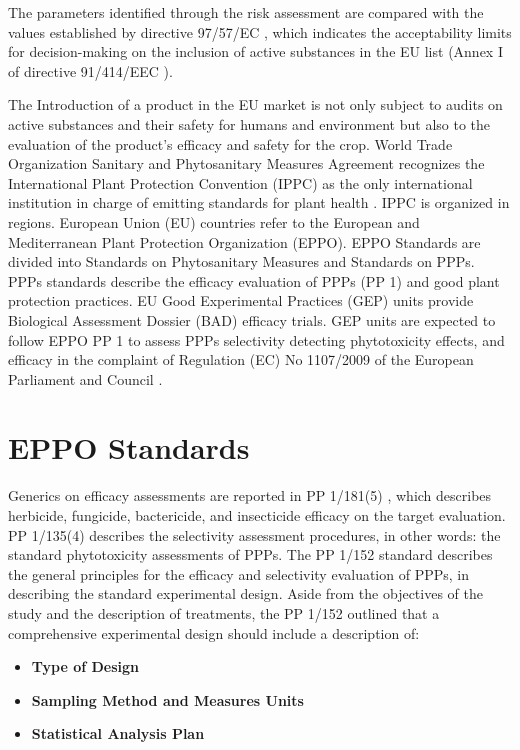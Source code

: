\documentclass[12pt,a4paper,oneside]{report}
\begin{document}
The parameters identified through the risk assessment are compared with the values 
established by directive 97/57/EC \cite{EURLex1997265}, which indicates the acceptability limits for 
decision-making on the inclusion of active substances in the EU list (Annex I of 
directive 91/414/EEC \cite{directive_91_414_EEC}).

The Introduction of a product in the EU market is not only subject to audits on
active substances and their safety for humans and environment but also to the evaluation 
of the product's efficacy and safety for the crop.
World Trade Organization Sanitary and Phytosanitary Measures Agreement \cite{WTO_SPS_Agreement}
recognizes the International Plant Protection Convention (IPPC) as the only international
institution in charge of emitting standards for plant health \cite{IPPC}. IPPC is organized in
regions. European Union (EU) countries refer to the European and Mediterranean Plant
Protection Organization (EPPO). EPPO Standards are divided into Standards on
Phytosanitary Measures and Standards on PPPs. PPPs standards describe the efficacy
evaluation of PPPs (PP 1) and good plant protection practices. EU Good Experimental
Practices (GEP) units provide
Biological Assessment Dossier (BAD) efficacy trials. GEP units are expected to follow
EPPO PP 1 to assess PPPs selectivity detecting phytotoxicity effects, and efficacy in the
complaint of Regulation (EC) No 1107/2009 of the European Parliament and Council \cite{EC_Regulation_1107_2009}.

\section{EPPO Standards}

Generics on efficacy assessments are reported in PP 1/181(5) \cite{EPPO_PP1_181}, which describes
herbicide, fungicide, bactericide, and insecticide efficacy on the target evaluation.
PP 1/135(4) \cite{EPPO_PP1_135} describes the selectivity assessment procedures, 
in other words: the standard phytotoxicity assessments of PPPs.
The PP 1/152 \cite{EPPO_PP1_152} standard describes the general principles for the
efficacy and selectivity evaluation of PPPs, in describing the standard experimental design.
Aside from the objectives of the study and the description of treatments, 
the PP 1/152 outlined that a comprehensive experimental design should include a description of:
\begin{itemize}
    \item \textbf{Type of Design}
    \item \textbf{Sampling Method and Measures Units}
    \item \textbf{Statistical Analysis Plan}
\end{itemize}
\end{document}
